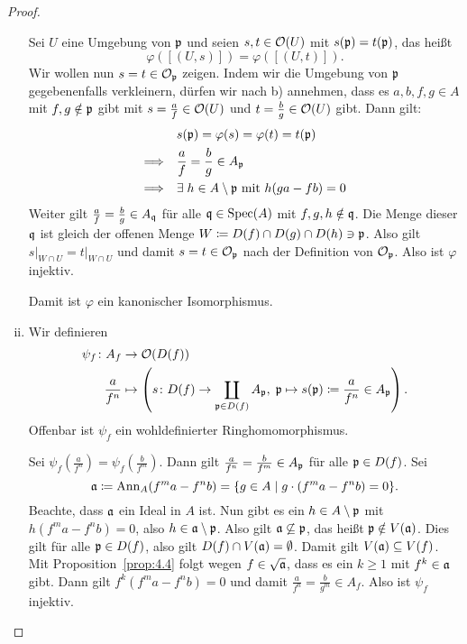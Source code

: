 \begin{prop}
\begin{proof}
\begin{enumerate}[i)]
			Sei $U$ eine Umgebung von $\mathfrak{p}$ und seien $s,t \in \mathcal{O}(U)$ mit $s(\mathfrak{p}) = t(\mathfrak{p})$, das heißt
			\[
				\varphi([(U,s)]) = \varphi([(U,t)]).
			\]
			Wir wollen nun $s=t \in \mathcal{O}_{\mathfrak{p}}$ zeigen. Indem wir die Umgebung von $\mathfrak{p}$ gegebenenfalls verkleinern, dürfen wir nach b) annehmen, dass es $a,b,f,g \in A$ mit $f,g \notin \mathfrak{p}$ gibt mit $s = \frac{a}{f} \in \mathcal{O}(U)$ und $t=\frac{b}{g}\in \mathcal{O}(U)$ gibt. Dann gilt:
			\begin{align*}
				& s(\mathfrak{p}) = \varphi(s) = \varphi(t) = t(\mathfrak{p})\\
				\Longrightarrow \quad & \frac{a}{f} = \frac{b}{g} \in A_{\mathfrak{p}}\\
				\Longrightarrow \quad & \exists\; h \in A \setminus \mathfrak{p} \text{ mit } h(ga-fb)=0
			\end{align*}
			Weiter gilt $\frac{a}{f}=\frac{b}{g} \in A_{\mathfrak{q}}$ für alle $\mathfrak{q} \in \operatorname{Spec}(A)$ mit $f,g,h \notin \mathfrak{q}$. Die Menge dieser $\mathfrak{q}$ ist gleich der offenen Menge $W \coloneqq D(f)\cap D(g) \cap D(h) \ni \mathfrak{p}$. Also gilt $s\vert_{W\cap U} = t\vert_{W\cap U}$ und damit $s=t \in \mathcal{O}_{\mathfrak{p}}$ nach der Definition von $\mathcal{O}_{\mathfrak{p}}$. Also ist $\varphi$ injektiv.

			Damit ist $\varphi$ ein kanonischer Isomorphismus.

			\item Wir definieren
			\begin{align*}
				\psi_f\colon A_f &\to \mathcal{O}(D(f))\\
				\frac{a}{f^n} & \mapsto \left(s\colon D(f) \to \coprod_{\mathfrak{p} \in D(f)}A_{\mathfrak{p}},\; \mathfrak{p} \mapsto s(\mathfrak{p})\coloneqq \frac{a}{f^n}\in A_{\mathfrak{p}}\right).
			\end{align*}
			Offenbar ist $\psi_f$ ein wohldefinierter Ringhomomorphismus.

			Sei $\psi_f\left(\frac{a}{f^n}\right) = \psi_f \left(\frac{b}{f^m}\right)$. Dann gilt $\frac{a}{f^n}=\frac{b}{f^m} \in A_{\mathfrak{p}}$ für alle $\mathfrak{p} \in D(f)$. Sei
			\[
				\mathfrak{a}\coloneqq \operatorname{Ann}_A(f^m a-f^n b) = \{g \in A \mid g \cdot (f^m a - f^n b) = 0\}.
			\]
			Beachte, dass $\mathfrak{a}$ ein Ideal in $A$ ist. Nun gibt es ein $h \in A \setminus \mathfrak{p}$ mit $h(f^m a -f^n b) = 0$, also $h \in \mathfrak{a} \setminus \mathfrak{p}$. Also gilt $\mathfrak{a} \not \subseteq \mathfrak{p}$, das heißt $\mathfrak{p} \notin V(\mathfrak{a})$. Dies gilt für alle $\mathfrak{p} \in D(f)$, also gilt $D(f) \cap V(\mathfrak{a}) = \emptyset$. Damit gilt $V(\mathfrak{a}) \subseteq V(f)$. Mit Proposition~\ref{prop:4.4} folgt wegen $f \in \sqrt{\mathfrak{a}}$, dass es ein $k \ge 1$ mit $f^k \in \mathfrak{a}$ gibt. Dann gilt
			$f^k(f^m a -f^n b) = 0$ und damit $\frac{a}{f^n} = \frac{b}{g^m} \in A_f$. Also ist $\psi_f$ injektiv.


\end{enumerate}
\end{proof}
\end{prop}
